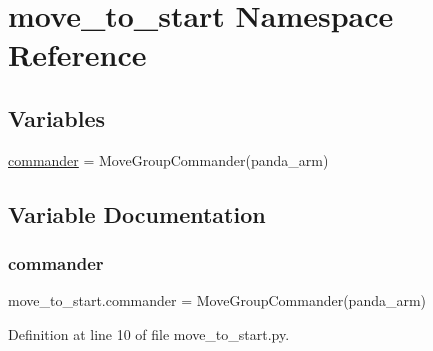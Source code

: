 \hypertarget{namespacemove__to__start}{}\section{move\+\_\+to\+\_\+start Namespace Reference}
\label{namespacemove__to__start}
\subsection*{Variables}
\begin{DoxyCompactItemize}
\item 
\hyperlink{namespacemove__to__start_af67697aff402aaf18bd07b21927ad26c}{commander} = Move\+Group\+Commander(\textquotesingle{}panda\+\_\+arm\textquotesingle{})
\end{DoxyCompactItemize}


\subsection{Variable Documentation}
\mbox{\label{namespacemove__to__start_af67697aff402aaf18bd07b21927ad26c}} 
\subsubsection{\texorpdfstring{commander}{commander}}
{\footnotesize\ttfamily move\+\_\+to\+\_\+start.\+commander = Move\+Group\+Commander(\textquotesingle{}panda\+\_\+arm\textquotesingle{})}



Definition at line 10 of file move\+\_\+to\+\_\+start.\+py.

